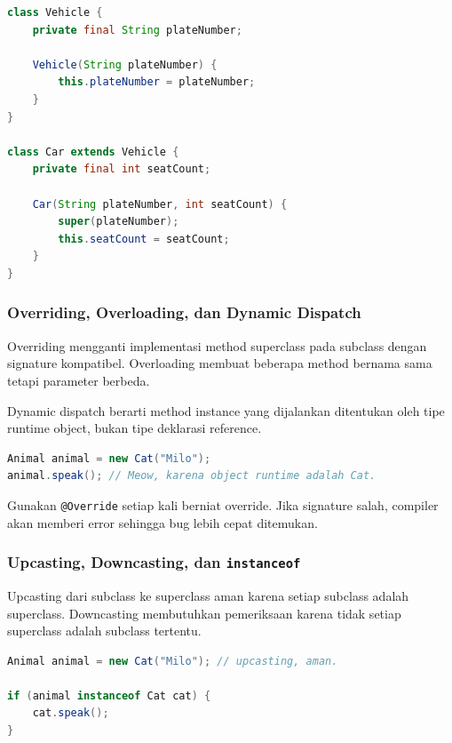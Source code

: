 \begin{lstlisting}[language=Java, caption={Constructor subclass wajib memanggil superclass}, label={lst:constructor-super}]
class Vehicle {
    private final String plateNumber;

    Vehicle(String plateNumber) {
        this.plateNumber = plateNumber;
    }
}

class Car extends Vehicle {
    private final int seatCount;

    Car(String plateNumber, int seatCount) {
        super(plateNumber);
        this.seatCount = seatCount;
    }
}
\end{lstlisting}

\subsubsection{Overriding, Overloading, dan Dynamic Dispatch}

\begin{jawab}
Overriding mengganti implementasi method superclass pada subclass dengan signature kompatibel. Overloading membuat beberapa method bernama sama tetapi parameter berbeda.
\end{jawab}

Dynamic dispatch berarti method instance yang dijalankan ditentukan oleh tipe runtime object, bukan tipe deklarasi reference.

\begin{lstlisting}[language=Java, caption={Dynamic dispatch pada method overriding}, label={lst:dynamic-dispatch}]
Animal animal = new Cat("Milo");
animal.speak(); // Meow, karena object runtime adalah Cat.
\end{lstlisting}

Gunakan \texttt{@Override} setiap kali berniat override. Jika signature salah, compiler akan memberi error sehingga bug lebih cepat ditemukan.

\subsubsection{Upcasting, Downcasting, dan \texttt{instanceof}}

\begin{jawab}
Upcasting dari subclass ke superclass aman karena setiap subclass adalah superclass. Downcasting membutuhkan pemeriksaan karena tidak setiap superclass adalah subclass tertentu.
\end{jawab}

\begin{lstlisting}[language=Java, caption={Upcasting dan downcasting aman}, label={lst:casting-inheritance}]
Animal animal = new Cat("Milo"); // upcasting, aman.

if (animal instanceof Cat cat) {
    cat.speak();
}
\end{lstlisting}

